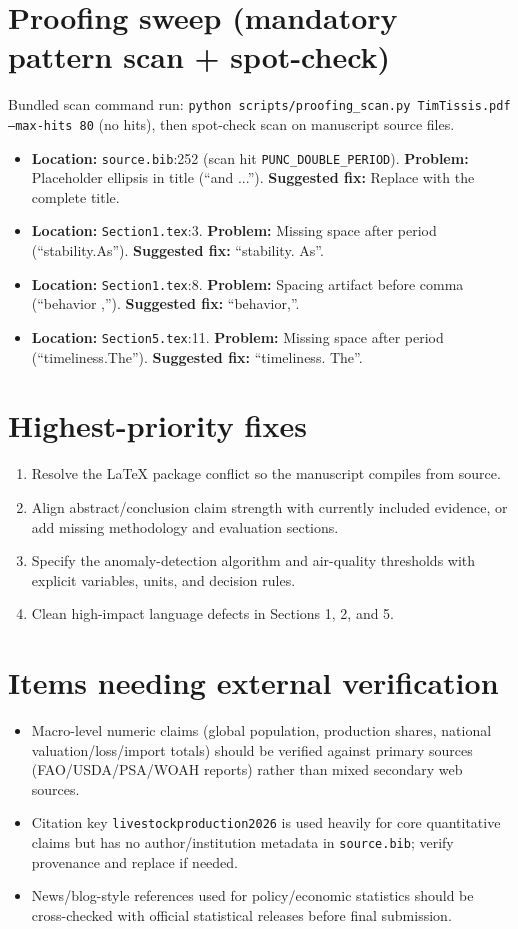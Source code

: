 \documentclass[11pt]{article}
\begin{document}
\section*{Proofing sweep (mandatory pattern scan + spot-check)}
Bundled scan command run: \texttt{python scripts/proofing\_scan.py TimTissis.pdf --max-hits 80} (no hits), then spot-check scan on manuscript source files.
\begin{itemize}[leftmargin=*]
  \item \textbf{Location:} \texttt{source.bib}:252 (scan hit \texttt{PUNC\_DOUBLE\_PERIOD}). \textbf{Problem:} Placeholder ellipsis in title (``and ...''). \textbf{Suggested fix:} Replace with the complete title.
  \item \textbf{Location:} \texttt{Section1.tex}:3. \textbf{Problem:} Missing space after period (``stability.As''). \textbf{Suggested fix:} ``stability. As''.
  \item \textbf{Location:} \texttt{Section1.tex}:8. \textbf{Problem:} Spacing artifact before comma (``behavior ,''). \textbf{Suggested fix:} ``behavior,''.
  \item \textbf{Location:} \texttt{Section5.tex}:11. \textbf{Problem:} Missing space after period (``timeliness.The''). \textbf{Suggested fix:} ``timeliness. The''.
\end{itemize}

\section*{Highest-priority fixes}
\begin{enumerate}[leftmargin=*]
  \item Resolve the LaTeX package conflict so the manuscript compiles from source.
  \item Align abstract/conclusion claim strength with currently included evidence, or add missing methodology and evaluation sections.
  \item Specify the anomaly-detection algorithm and air-quality thresholds with explicit variables, units, and decision rules.
  \item Clean high-impact language defects in Sections 1, 2, and 5.
\end{enumerate}

\section*{Items needing external verification}
\begin{itemize}[leftmargin=*]
  \item Macro-level numeric claims (global population, production shares, national valuation/loss/import totals) should be verified against primary sources (FAO/USDA/PSA/WOAH reports) rather than mixed secondary web sources.
  \item Citation key \texttt{livestockproduction2026} is used heavily for core quantitative claims but has no author/institution metadata in \texttt{source.bib}; verify provenance and replace if needed.
  \item News/blog-style references used for policy/economic statistics should be cross-checked with official statistical releases before final submission.
\end{itemize}
\end{document}
